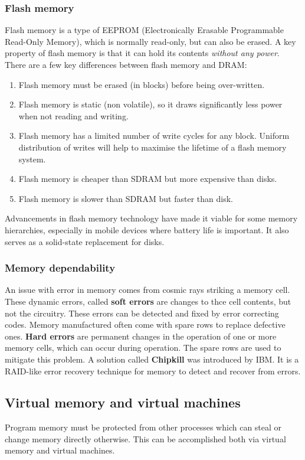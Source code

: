 \documentclass[11pt]{article}
\begin{document}
\subsubsection{Flash memory}
Flash memory is a type of EEPROM (Electronically Erasable Programmable Read-Only Memory), which is normally read-only, but can also be erased. A key property of flash memory is that it can hold its contents \textit{without any power}. There are a few key differences between flash memory and DRAM:
\begin{enumerate}
\item Flash memory must be erased (in blocks) before being over-written.
\item Flash memory is static (non volatile), so it draws significantly less power when not reading and writing.
\item Flash memory has a limited number of write cycles for any block. Uniform distribution of writes will help to maximise the lifetime of a flash memory system.
\item Flash memory is cheaper than SDRAM but more expensive than disks.
\item Flash memory is slower than SDRAM but faster than disk. 
\end{enumerate}
Advancements in flash memory technology have made it viable for some memory hierarchies, especially in mobile devices where battery life is important. It also serves as a solid-state replacement for disks.

\subsubsection{Memory dependability}
An issue with error in memory comes from cosmic rays striking a memory cell. These dynamic errors, called \textbf{soft errors} are changes to thce cell contents, but not the circuitry. These errors can be detected and fixed by error correcting codes. Memory manufactured often come with spare rows to replace defective ones. \textbf{Hard errors} are permanent changes in the operation of one or more memory cells, which can occur during operation. The spare rows are used to mitigate this problem.
\n
A solution called \textbf{Chipkill} was introduced by IBM. It is a RAID-like error recovery technique for memory to detect and recover from errors.

\subsection{Virtual memory and virtual machines}
Program memory must be protected from other processes which can steal or change memory directly otherwise. This can be accomplished both via virtual memory and virtual machines.
\end{document}

